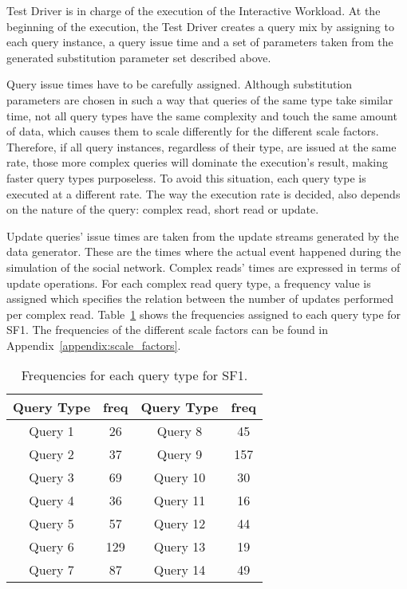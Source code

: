 \ldbcsnb Test Driver is in charge of the execution of the Interactive Workload.
At the beginning of the execution, the Test Driver creates a query mix by
assigning to each query instance, a query issue time and a set of parameters
taken from the generated substitution parameter set described above.  

Query issue times have to be carefully assigned.  Although substitution
parameters are chosen in such a way that queries of the same type take similar
time, not all query types have the same complexity and touch the same amount of
data, which causes them to scale differently for the different scale factors.
Therefore, if all query instances, regardless of their type, are issued
at the same rate, those more complex queries will dominate the execution's
result, making faster query types purposeless. To avoid this situation, each
query type is executed at a different rate. The way the execution rate is decided,
also depends on the nature of the query: complex read, short read or update.

Update queries' issue times are taken from the update streams generated by the
data generator. These are the times where the actual event happened during the
simulation of the social network. Complex reads' times are expressed in terms
of update operations. For each complex read query type, a frequency value is
assigned which specifies the relation between the number of updates performed
per complex read.  Table~\ref{table:freqs} shows the frequencies assigned to
each query type for SF1. The frequencies of the different scale factors can be
found in Appendix~\ref{appendix:scale_factors}.

\begin{table}[H]
\centering
    \begin{tabular}{|c|c|c|c|}
    \hline
    Query Type & freq & Query Type & freq \\ 
    \hline
    \hline
    Query 1 & 26 & Query 8 & 45 \\ 
    \hline       
    Query 2 & 37 & Query 9 & 157 \\  
    \hline        
    Query 3 & 69 & Query 10 & 30 \\ 
    \hline        
    Query 4 & 36 & Query 11 & 16 \\ 
    \hline        
    Query 5 & 57 & Query 12 & 44 \\ 
    \hline        
    Query 6 & 129 & Query 13 & 19 \\  
    \hline        
    Query 7 & 87 & Query 14 & 49 \\ 
    \hline
    \end{tabular}
    \caption{Frequencies for each query type for SF1.}
    \label{table:freqs}
\end{table}

